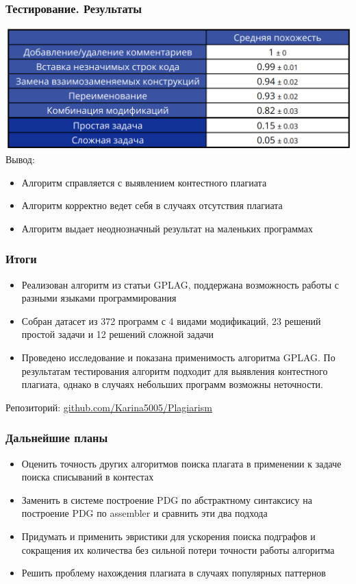 \documentclass[10pt]{beamer}
\begin{document}
\begin{frame}\frametitle{Тестирование. Результаты}
	\hspace*{-0.4cm}
	\includegraphics[scale=0.7]{res0.png}
	Вывод: 
	\begin{itemize}
		\item Алгоритм справляется с выявлением контестного плагиата
		\item Алгоритм корректно ведет себя в случаях отсутствия плагиата
		\item Алгоритм выдает неоднозначный результат на маленьких программах
	\end{itemize}
	
\end{frame}


\begin{frame}\frametitle{Итоги}
	\begin{itemize}
		\item Реализован алгоритм из статьи GPLAG, поддержана возможность работы с разными языками программирования
		\item Собран датасет из 372 программ с 4 видами модификаций, 23 решений простой задачи и 12 решений сложной задачи
		\item Проведено исследование и показана применимость алгоритма GPLAG. По результатам тестирования алгоритм подходит для выявления контестного плагиата, однако в случаях небольших программ возможны неточности.
		\newline
	\end{itemize}

    Репозиторий: \href{https://github.com/Karina5005/Plagiarism}{\color{blue}github.com/Karina5005/Plagiarism}
\end{frame}

\begin{frame}\frametitle{Дальнейшие планы}
    \begin{itemize}
    	\item Оценить точность других алгоритмов поиска плагата в применении к задаче поиска списываний в контестах
        \item Заменить в системе построение PDG по абстрактному синтаксису на построение PDG по assembler и сравнить эти два подхода
        \item Придумать и применить эвристики для ускорения поиска подграфов и сокращения их количества без сильной потери точности работы алгоритма
        \item Решить проблему нахождения плагиата в случаях популярных паттернов
        
    \end{itemize}
\end{frame}
\end{document}
